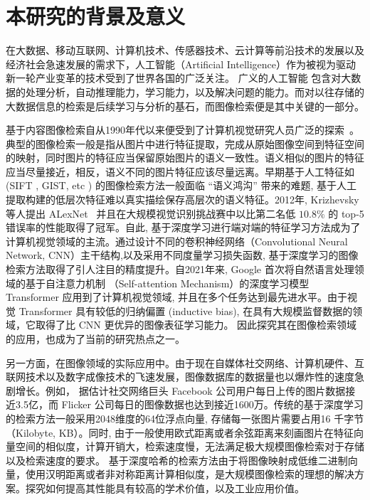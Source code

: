 \section{本研究的背景及意义}
在大数据、移动互联网、计算机技术、传感器技术、云计算等前沿技术的发展以及经济社会急速发展的需求下，人工智能（Artificial Intelligence）作为被视为驱动新一轮产业变革的技术受到了世界各国的广泛关注。 广义的人工智能\cite{russell2010artificial} 包含对大数据的处理分析，自动推理能力，学习能力，以及解决问题的能力。而对以往存储的大数据信息的检索是后续学习与分析的基石，而图像检索便是其中关键的一部分。 \par
基于内容图像检索自从1990年代以来便受到了计算机视觉研究人员广泛的探索~\cite{zhou2017recent}。典型的图像检索一般是指从图片中进行特征提取，完成从原始图像空间到特征空间的映射，同时图片的特征应当保留原始图片的语义一致性。语义相似的图片的特征应当尽量接近，相反，语义不同的图片特征应该尽量远离。早期基于人工特征如 (SIFT , GIST, etc ) 的图像检索方法一般面临 ``语义鸿沟'' \cite{li2016socializing} 带来的难题, 基于人工提取构建的低层次特征难以真实描绘保存高层次的语义特征。2012年, Krizhevsky 等人提出 ALexNet~\cite{krizhevsky2017imagenet} 并且在大规模视觉识别挑战赛中以比第二名低 $10.8\%$ 的 top-5 错误率的性能取得了冠军。自此, 基于深度学习进行端对端的特征学习方法成为了计算机视觉领域的主流。通过设计不同的卷积神经网络（Convolutional Neural Network, CNN）主干结构,以及采用不同度量学习损失函数, 基于深度学习的图像检索方法取得了引人注目的精度提升。自2021年来, Google 首次将自然语言处理领域的基于自注意力机制 （Self-attention Mechanism）的深度学习模型 Transformer 应用到了计算机视觉领域, 并且在多个任务达到最先进水平。由于视觉 Transformer 具有较低的归纳偏置 (inductive bias), 在具有大规模监督数据的领域，它取得了比 CNN 更优异的图像表征学习能力。 因此探究其在图像检索领域的应用，也成为了当前的研究热点之一。  \par
另一方面，在图像领域的实际应用中。由于现在自媒体社交网络、计算机硬件、互联网技术以及数字成像技术的飞速发展，图像数据库的数据量也以爆炸性的速度急剧增长。例如， 据估计社交网络巨头 Facebook 公司用户每日上传的图片数据接近3.5亿，而 Flicker 公司每日的图像数据也达到接近1600万。传统的基于深度学习的检索方法一般采用2048维度的64位浮点向量, 存储每一张图片需要占用16 千字节 （Kilobyte, KB）。同时, 由于一般使用欧式距离或者余弦距离来刻画图片在特征向量空间的相似度，计算开销大，检索速度慢，无法满足极大规模图像检索对于存储以及检索速度的要求。 基于深度哈希的检索方法由于将图像映射成低维二进制向量，使用汉明距离或者非对称距离计算相似度，是大规模图像检索的理想的解决方案。探究如何提高其性能具有较高的学术价值，以及工业应用价值。\par
